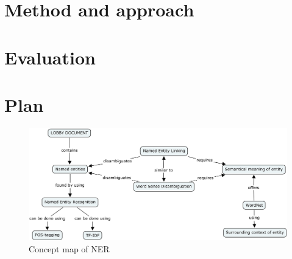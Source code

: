 \documentclass{article}
\begin{document}
\section{Method and approach}

\section{Evaluation}

\section{Plan}





\begin{figure}
    \centering
    \includegraphics[scale=0.18]{Figures/ner}
    \caption{Concept map of NER}
    \label{fig:ner}
\end{figure}






\end{document}
